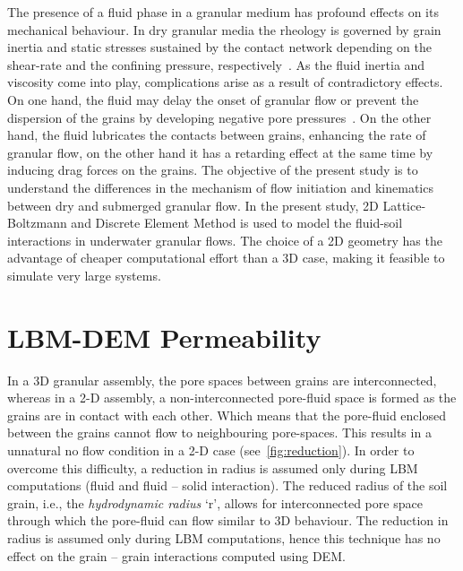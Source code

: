 The presence of a fluid phase in a granular medium has profound effects on its 
mechanical behaviour. In dry granular media the rheology is governed by grain 
inertia and static stresses sustained by the contact network depending on the 
shear-rate and the confining pressure, respectively~\citep{Midi2004}. As the 
fluid inertia and viscosity come into play, complications arise as a result of 
contradictory effects. On one hand, the fluid may delay the onset of
granular flow or prevent the dispersion of the grains by
developing negative pore pressures~\citep{Pailha2008,Topin2011}. On the other
hand, the fluid lubricates the contacts between grains, enhancing the rate of 
granular flow, on the other hand it has a retarding effect at the same time by 
inducing drag forces on the grains. The objective of the present study is to 
understand 
the differences in the mechanism of flow initiation and kinematics between dry 
and submerged granular flow. In the present study, 2D Lattice-Boltzmann and 
Discrete Element Method is used to model the fluid-soil interactions in  
underwater granular flows.  The choice of a 2D geometry has the advantage of 
cheaper computational effort than a 3D case, making it feasible to 
simulate very large systems. 



\section{LBM-DEM Permeability}

In a 3D granular assembly, the pore spaces between grains are 
interconnected, whereas in a 2-D assembly, a non-interconnected pore-fluid 
space is formed as the grains are in contact with each 
other. Which means that the pore-fluid enclosed between the grains cannot flow 
to neighbouring pore-spaces.  This results in a unnatural no flow condition in 
a 2-D case (see~\cref{fig:reduction}). In order to overcome this difficulty, a 
reduction in radius is assumed only during LBM computations (fluid and fluid – 
solid interaction). The reduced radius of the soil grain, i.e., the 
\textit{hydrodynamic radius} `r', allows for interconnected pore space through 
which the pore-fluid can flow similar to 3D behaviour. The reduction in radius 
is assumed only during LBM computations, hence this technique has no effect on 
the grain – grain interactions computed using DEM. 


